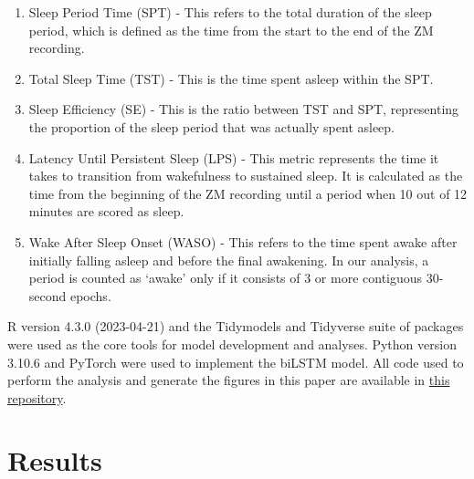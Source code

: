 \documentclass[
  super,
  preprint,
  3p]{elsarticle}
\begin{document}
\begin{enumerate}
\def\labelenumi{\arabic{enumi}.}
\item
  Sleep Period Time (SPT) - This refers to the total duration of the
  sleep period, which is defined as the time from the start to the end
  of the ZM recording.
\item
  Total Sleep Time (TST) - This is the time spent asleep within the SPT.
\item
  Sleep Efficiency (SE) - This is the ratio between TST and SPT,
  representing the proportion of the sleep period that was actually
  spent asleep.
\item
  Latency Until Persistent Sleep (LPS) - This metric represents the time
  it takes to transition from wakefulness to sustained sleep. It is
  calculated as the time from the beginning of the ZM recording until a
  period when 10 out of 12 minutes are scored as sleep.
\item
  Wake After Sleep Onset (WASO) - This refers to the time spent awake
  after initially falling asleep and before the final awakening. In our
  analysis, a period is counted as `awake' only if it consists of 3 or
  more contiguous 30-second epochs.
\end{enumerate}

R version 4.3.0 (2023-04-21)\citep{R-lang} and the
Tidymodels\citep{tidymodels} and Tidyverse\citep{tidyverse} suite of
packages were used as the core tools for model development and analyses.
Python version 3.10.6\citep{10.5555/1593511} and
PyTorch\citep{NEURIPS2019_9015} were used to implement the biLSTM model.
All code used to perform the analysis and generate the figures in this
paper are available in
\href{https://github.com/esbenlykke/sleep_study}{this repository}.

\hypertarget{results}{%
\section{Results}\label{results}}
\end{document}
